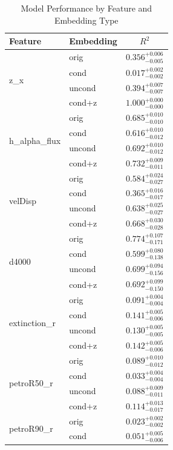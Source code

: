 \begin{table}[htbp]
\centering
\caption{Model Performance by Feature and Embedding Type}
\begin{tabular}{llc}
\toprule
\textbf{Feature} & \textbf{Embedding} & \textbf{$R^2$} \\
\midrule
\multirow{4}{*}{z\_x} & orig & $0.356^{+0.006}_{-0.005}$ \\
 & cond & $0.017^{+0.002}_{-0.002}$ \\
 & uncond & $0.394^{+0.007}_{-0.007}$ \\
 & cond+z & $1.000^{+0.000}_{-0.000}$ \\
\midrule
\multirow{4}{*}{h\_alpha\_flux} & orig & $0.685^{+0.010}_{-0.010}$ \\
 & cond & $0.616^{+0.010}_{-0.012}$ \\
 & uncond & $0.692^{+0.010}_{-0.012}$ \\
 & cond+z & $0.732^{+0.009}_{-0.011}$ \\
\midrule
\multirow{4}{*}{velDisp} & orig & $0.584^{+0.024}_{-0.027}$ \\
 & cond & $0.365^{+0.016}_{-0.017}$ \\
 & uncond & $0.638^{+0.025}_{-0.027}$ \\
 & cond+z & $0.668^{+0.030}_{-0.028}$ \\
\midrule
\multirow{4}{*}{d4000} & orig & $0.774^{+0.107}_{-0.171}$ \\
 & cond & $0.599^{+0.080}_{-0.138}$ \\
 & uncond & $0.699^{+0.094}_{-0.156}$ \\
 & cond+z & $0.692^{+0.099}_{-0.150}$ \\
\midrule
\multirow{4}{*}{extinction\_r} & orig & $0.091^{+0.004}_{-0.004}$ \\
 & cond & $0.141^{+0.005}_{-0.006}$ \\
 & uncond & $0.130^{+0.005}_{-0.005}$ \\
 & cond+z & $0.142^{+0.005}_{-0.006}$ \\
\midrule
\multirow{4}{*}{petroR50\_r} & orig & $0.089^{+0.010}_{-0.012}$ \\
 & cond & $0.033^{+0.004}_{-0.004}$ \\
 & uncond & $0.088^{+0.009}_{-0.011}$ \\
 & cond+z & $0.114^{+0.013}_{-0.017}$ \\
\midrule
\multirow{4}{*}{petroR90\_r} & orig & $0.023^{+0.002}_{-0.002}$ \\
 & cond & $0.051^{+0.005}_{-0.006}$ \\

\end{tabular}
\end{table}
